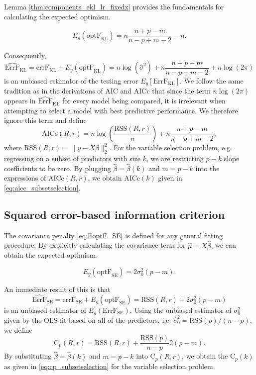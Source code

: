 Lemma \ref{thm:components_ekl_lr_fixedx} provides the fundamentals for calculating the expected optimism.
\begin{theorem}
\begin{equation*}
E_y(\text{optF}_\text{KL}) = n \frac{n+p-m}{n-p+m-2} - n.
\end{equation*}
\label{thm:EoptF_KL}
\end{theorem}

Consequently, 
\begin{equation*}
\widehat{\text{ErrF}}_\text{KL} = \text{errF}_\text{KL} + E_y(\text{optF}_\text{KL}) = n\log(\hat\sigma^2) + n \frac{n+p-m}{n-p+m-2} + n\log(2\pi)
\end{equation*}
is an unbiased estimator of the testing error $E_y \left[ \text{ErrF}_\text{KL} \right]$. We follow the same tradition as in the derivations of AIC and AICc that since the term $n\log(2\pi)$ appears in $\widehat{\text{ErrF}}_\text{KL}$ for every model being compared, it is irrelevant when attempting to select a model with best predictive performance. We therefore ignore this term and define 
\begin{equation*}
 \text{AICc}(R,r) = n\log \left( \frac{\text{RSS}(R,r)}{n}  \right) + n \frac{n+p-m}{n-p+m-2},
\end{equation*}
where RSS$(R,r)= \lVert y -X\hat\beta \rVert_2^2$. For the variable selection problem, e.g. regressing on a subset of predictors with size $k$, we are restricting $p-k$ slope coefficients to be zero. By plugging $\hat\beta = \hat\beta(k)$ and $m=p-k$ into the expressions of AICc$(R,r)$, we obtain AICc$(k)$ given in \eqref{eq:aicc_subsetselection}.


\subsection{Squared error-based information criterion}
The covariance penalty \eqref{eq:EoptF_SE} is defined for any general fitting procedure. By explicitly calculating the covariance term for $\hat\mu=X\hat\beta$, we can obtain the expected optimism.
\begin{theorem}
\begin{equation*}
E_y (\text{optF}_\text{SE}) = 2 \sigma_0^2 (p-m).
\end{equation*}
\label{thm:EoptF_SE}
\end{theorem}

An immediate result of this is that
\begin{equation*}
\widehat{\text{ErrF}}_\text{SE} = \text{errF}_\text{SE} + E_y(\text{optF}_\text{SE}) = \text{RSS}(R,r) + 2 \sigma_0^2 (p-m)
\end{equation*}
is an unbiased estimator of $E_y(\text{ErrF}_\text{SE})$. Using the unbiased estimator of $\sigma_0^2$ given by the OLS fit based on all of the predictors, i.e. $\hat\sigma_0^2=\text{RSS}(p)/(n-p)$, we define
\begin{equation*}
\text{C}_p(R,r) = \text{RSS}(R,r) + \frac{\text{RSS}(p)}{n-p} 2(p-m).
\end{equation*}
By substituting $\hat\beta = \hat\beta(k)$ and $m=p-k$ into C$_p(R,r)$, we obtain the C$_p(k)$ as given in \eqref{eq:cp_subsetselection} for the variable selection problem.

